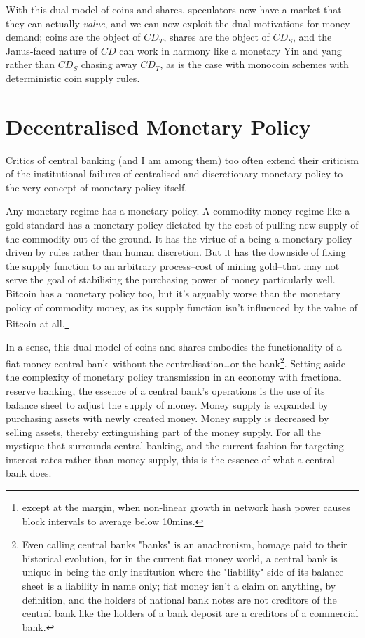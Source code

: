 \documentclass[twocolumn]{article}
\begin{document}
With this dual model of coins and shares, speculators now have a
market that they can actually \emph{value}, and we can now exploit the
dual motivations for money demand; coins are the object of $CD_{T}$,
shares are the object of $CD_{S}$, and the Janus-faced nature of $CD$
can work in harmony like a monetary Yin and yang rather than $CD_{S}$
chasing away $CD_{T}$, as is the case with monocoin schemes with
deterministic coin supply rules.

\section*{Decentralised Monetary Policy}
Critics of central banking (and I am among them) too often extend
their criticism of the institutional failures of centralised and
discretionary monetary policy to the very concept of monetary policy
itself. 

Any monetary regime has a monetary policy. A commodity money regime
like a gold-standard has a monetary policy dictated by the cost of
pulling new supply of the commodity out of the ground. It has the
virtue of a being a monetary policy driven by rules rather than human
discretion. But it has the downside of fixing the supply function to
an arbitrary process--cost of mining gold--that may not serve the goal
of stabilising the purchasing power of money particularly
well. Bitcoin has a monetary policy too, but it's arguably worse than
the monetary policy of commodity money, as its supply function isn't
influenced by the value of Bitcoin at all.\footnote{except at the
  margin, when non-linear growth in network hash power causes block
  intervals to average below 10mins.}

In a sense, this dual model of coins and shares embodies the
functionality of a fiat money central bank--without the
centralisation\dots or the bank\footnote{Even calling central banks
  "banks" is an anachronism, homage paid to their historical
  evolution, for in the current fiat money world, a central bank is
  unique in being the only institution where the "liability" side of
  its balance sheet is a liability in name only; fiat money isn't a
  claim on anything, by definition, and the holders of national bank
  notes are not creditors of the central bank like the holders of a
  bank deposit are a creditors of a commercial bank.}. Setting aside
the complexity of monetary policy transmission in an economy with
fractional reserve banking, the essence of a central bank's operations
is the use of its balance sheet to adjust the supply of money. Money
supply is expanded by purchasing assets with newly created
money. Money supply is decreased by selling assets, thereby
extinguishing part of the money supply. For all the mystique that
surrounds central banking, and the current fashion for targeting
interest rates rather than money supply, this is the essence of what a
central bank does.
\end{document}
